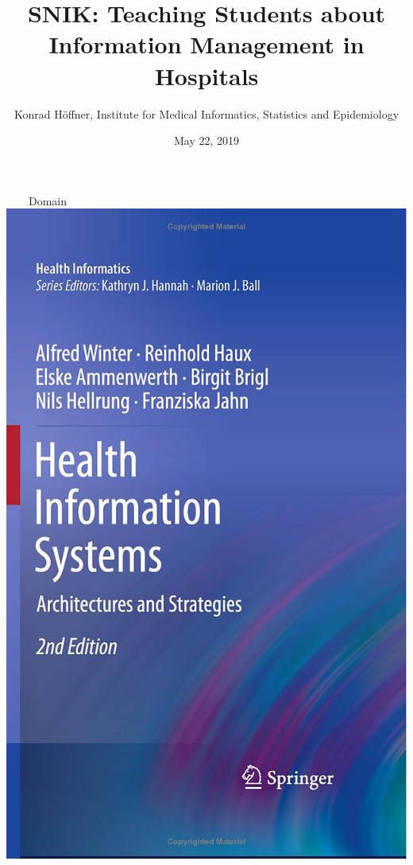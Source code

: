 \documentclass[aspectratio=1610,12pt]{beamer}
\author{Konrad Höffner, Institute for Medical Informatics, Statistics and Epidemiology}
\title{SNIK: Teaching Students about Information Management in Hospitals}
\subtitle{}
\date{May 22, 2019}
\begin{document}
\begin{frame}
\titlepage
\end{frame}

\begin{frame}[plain]{~~~~Domain}
\centering\includegraphics[height=0.77\textheight,keepaspectratio]{img/book-bb.jpg}

\end{frame}
\end{document}
